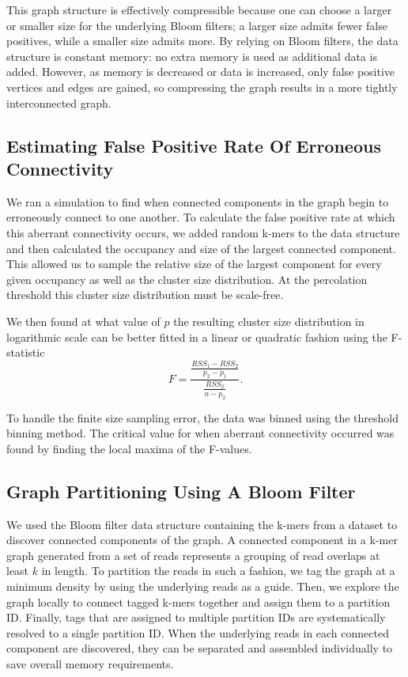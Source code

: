 \documentclass[12pt]{article} \usepackage{simplemargins}
\begin{document}
This graph structure is effectively compressible 
because one can choose a larger
or smaller size for the underlying Bloom filters; a larger size admits fewer
false positives, while a smaller size admits more. By relying on Bloom
filters, the data structure is constant memory: no extra memory is
used as additional data is added. However, as memory is decreased or data
is increased, only false positive vertices and edges are gained, so
compressing the graph results in a more tightly interconnected graph.

\subsection{Estimating False Positive Rate Of Erroneous Connectivity}
We ran a simulation to find when connected components in the graph 
begin to erroneously connect to one another.
To calculate the false positive rate at which this aberrant 
connectivity occurs, 
we added random k-mers to the data structure 
and then calculated the occupancy and size of 
the largest connected 
component. This allowed us to sample the relative size of 
the largest component for every 
given occupancy as well as the cluster size distribution. 
At the percolation threshold this cluster size distribution 
must be scale-free\cite{stauffer1979scaling}. 

We then found at what value of $p$ the resulting 
cluster size distribution in logarithmic 
scale can be better fitted in a linear or quadratic fashion using 
the F-statistic
\newline
\newline
\begin{displaymath}
F=\frac{\frac{RSS_1-RSS_2}{p_2-p_1}}{\frac{RSS_2}{n-p_2}}.
\end{displaymath}

To handle the finite size sampling error, the data was binned using the 
threshold binning method\cite{adami2002critical}. The critical value for 
when aberrant connectivity occurred was found by finding the local maxima 
of the F-values.

\subsection{Graph Partitioning Using A Bloom Filter}
We used the Bloom filter data structure containing the k-mers from a dataset 
to discover connected components of the graph. A connected component in a 
k-mer graph generated from a set of reads represents a grouping of read overlaps 
at least $k$ in length. To partition the reads in such a fashion, we tag the 
graph at a minimum density by using the underlying reads as a guide. Then, we 
explore the graph locally to connect tagged k-mers together and assign them 
to a partition ID. Finally, tags that are assigned to multiple partition IDs 
are systematically resolved to a single partition ID.  
When the underlying reads in each connected component are discovered, they can be 
separated and assembled individually to save overall memory requirements.
\end{document}
